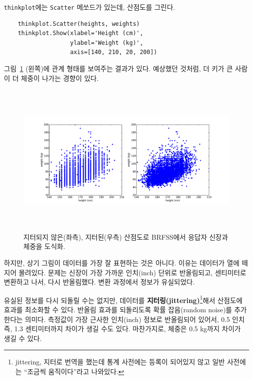 
{\tt thinkplot}에는 {\tt Scatter} 메쏘드가 있는데, 산점도를 그린다.
%
\begin{verbatim}
    thinkplot.Scatter(heights, weights)
    thinkplot.Show(xlabel='Height (cm)',
                   ylabel='Weight (kg)',
                   axis=[140, 210, 20, 200])
\end{verbatim}

그림~\ref{scatter1} (왼쪽)에 관계 형태를 보여주는 결과가 있다.
예상했던 것처럼, 더 키가 큰 사람이 더 체중이 나가는 경향이 있다.

\begin{figure}
\centerline{\includegraphics[height=3.0in]{figs/scatter1.pdf}}
\caption{지터되지 않은(좌측), 지터된(우측) 산점도로 BRFSS에서 응답자 신장과 체중을 도식화.}
\label{scatter1}
\end{figure}

하지만, 상기 그림이 데이터를 가장 잘 표현하는 것은 아니다.
이유는 데이터가 열에 떼지어 몰려있다. 문제는 
신장이 가장 가까운 인치(inch) 단위로 반올림되고, 센티미터로 변환하고 나서,
다시 반올림했다. 변환 과정에서 정보가 유실되었다.


유실된 정보를 다시 되돌릴 수는 없지만, 데이터를 {\bf 지터링(jittering)}\footnote{jittering, 지터로 번역을 했는데 통계 사전에는 등록이 되어있지 않고 일반 사전에는 ``조금씩 움직이다''라고 나와있다.}해서 
산점도에 효과를 최소화할 수 있다. 반올림 효과를 되돌리도록 확률 잡음(random noise)를 추가한다는 의미다.
측정값이 가장 근사한 인치(inch) 정보로 반올림되어 있어서, 0.5 인치 즉, 1.3 센티미터까지 차이가 생길 수도 있다. 마찬가지로, 체중은 0.5 kg까지 차이가 생길 수 있다. 

